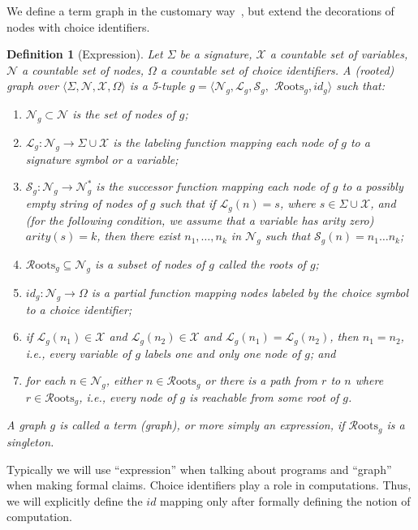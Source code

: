 \documentclass{mytlp}
\newcommand{\Roots}{\ensuremath{\mathcal{R}\mathrm{oots}}}
\newcommand{\nodes}{\ensuremath{\mathcal{N}}}
\newcommand{\xlabel}{\ensuremath{\mathcal{L}}}
\newcommand{\xsucc}{\ensuremath{\mathcal{S}}}
\newcommand{\vars}{\ensuremath{\mathcal{X}}}
\newtheorem{definition}{Definition}
\begin{document}
We define a term graph in the customary
way~\cite{EchahedJanodet97IMAG},
but extend the decorations of nodes
with choice identifiers.
\begin{definition}[Expression]
\label{def:expression}
Let $\Sigma$ be a \emph{signature},
$\vars$ a countable set of \emph{variables},
$\nodes$ a countable set of \emph{nodes},
$\Omega$ a countable set of \emph{choice identifiers}.
A \emph{(rooted)} \emph{graph} over
$\langle\Sigma,\nodes,\vars,\Omega\rangle$
is a 5-tuple 
$g=\langle \nodes_g,\xlabel_g,\xsucc_g,$ $\Roots_g,id_g\rangle$
such that: 
\begin{enumerate}
\renewcommand{\labelenumi}{\arabic{enumi}.}
\item {}
$\nodes_g \subset \nodes$ is the set of nodes of $g$;
\item {}
$\xlabel_g : \nodes_g \to \Sigma \cup \vars$ is the \emph{labeling}
function mapping each node of $g$ to a signature symbol or a variable;
\item {}
$\xsucc_g : \nodes_g \to \nodes_g^*$
is the \emph{successor}
function mapping each node of $g$ to a possibly empty string of
nodes of $g$ such that
if $\xlabel_g(n)=s$, where $s \in \Sigma \cup \vars$,
and (for the following condition, we assume that a variable has arity zero)
$\mathit{arity}(s)=k$,
then there exist $n_1,\ldots,n_k$ in $\nodes_g$ such that
$\xsucc_g(n)=n_1 \ldots n_k$;
\item{}
$\Roots_g \subseteq \nodes_g$ is a subset of nodes of $g$
called the \emph{roots} of $g$;
\item {} $id_g : \nodes_g \to \Omega$ is a partial function
mapping nodes labeled by the choice symbol to a choice identifier;
\item{}
if $\xlabel_g(n_1) \in \vars$ and $\xlabel_g(n_2) \in \vars$
and $\xlabel_g(n_1) = \xlabel_g(n_2)$, then $n_1 = n_2$,
i.e., every variable of $g$ labels one and only one node of $g$; and
\item {}
for each $n \in \nodes_g$, either $n \in \Roots_g$
or there is a path from $r$ to $n$
where $r \in \Roots_g$, i.e., every node of $g$ is reachable
from some root of $g$.
\end{enumerate}
A graph $g$ is called a \emph{term (graph)},
or more simply an \emph{expression}, if $\Roots_g$ is a singleton.
\end{definition}
Typically we will use ``expression'' when talking about programs
and ``graph'' when making formal claims.
Choice identifiers play a role in computations.
Thus, we will explicitly define the $id$ mapping
only after formally defining the notion of computation.
\end{document}
